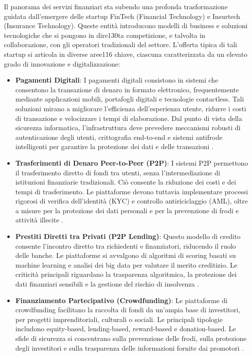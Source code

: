 Il panorama dei servizi finanziari sta subendo una profonda trasformazione guidata dall'emergere delle startup FinTech (Financial Technology) e Insurtech (Insurance Technology). Queste entità introducono modelli di business e soluzioni tecnologiche che si pongono in dire130ta competizione, e talvolta in collaborazione, con gli operatori tradizionali del settore. L'offerta tipica di tali startup si articola in diverse aree116 chiave, ciascuna caratterizzata da un elevato grado di innovazione e digitalizzazione:

\begin{itemize}
    \item \textbf{Pagamenti Digitali}: I pagamenti digitali consistono in sistemi che consentono la transazione di denaro in formato elettronico, frequentemente mediante applicazioni mobili, portafogli digitali e tecnologie contactless. Tali soluzioni mirano a migliorare l'efficienza dell'esperienza utente, ridurre i costi di transazione e velocizzare i tempi di elaborazione. Dal punto di vista della sicurezza informatica, l'infrastruttura deve prevedere meccanismi robusti di autenticazione degli utenti, crittografia end-to-end e sistemi antifrode intelligenti per garantire la protezione dei dati e delle transazioni \cite{zhang2020digital}.
    
    \item \textbf{Trasferimenti di Denaro Peer-to-Peer (P2P)}: I sistemi P2P permettono il trasferimento diretto di fondi tra utenti, senza l'intermediazione di istituzioni finanziarie tradizionali. Ciò consente la riduzione dei costi e dei tempi di trasferimento. Le piattaforme devono tuttavia implementare processi rigorosi di verifica dell'identità (KYC) e controllo antiriciclaggio (AML), oltre a misure per la protezione dei dati personali e per la prevenzione di frodi e attività illecite \cite{zhang2020digital}.
    
    \item \textbf{Prestiti Diretti tra Privati (P2P Lending)}: Questo modello di credito consente l'incontro diretto tra richiedenti e finanziatori, riducendo il ruolo delle banche. Le piattaforme si avvalgono di algoritmi di scoring basati su machine learning e analisi dei big data per valutare il merito creditizio. Le criticità principali riguardano la trasparenza algoritmica, la protezione dei dati finanziari sensibili e la gestione del rischio di insolvenza \cite{milne2016p2p}.
    
    \item \textbf{Finanziamento Partecipativo (Crowdfunding)}: Le piattaforme di crowdfunding facilitano la raccolta di fondi da un'ampia base di investitori, per progetti imprenditoriali, culturali o sociali. Le principali tipologie includono equity-based, lending-based, reward-based e donation-based. Le sfide di sicurezza si concentrano sulla prevenzione delle frodi, sulla protezione degli investitori e sulla trasparenza delle informazioni fornite dai promotori \cite{hornuf2018crowdfunding}.
    

\end{itemize}
